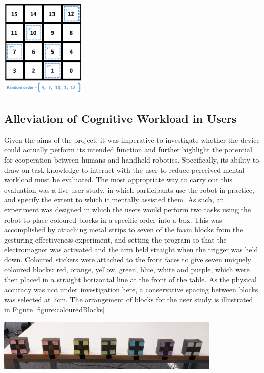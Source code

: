 \documentclass[11pt]{article}
\begin{document}
\begin{center}
\includegraphics[width=0.3\textwidth]{images/gridSequence.png}
\label{figure:gridSequence}
\end{center}



\subsection{Alleviation of Cognitive Workload in Users}

Given the aims of the project, it was imperative to investigate whether the device could actually perform its intended function and further highlight the potential for cooperation between humans and handheld robotics. Specifically, its ability to draw on task knowledge to interact with the user to reduce perceived mental workload must be evaluated. The most appropriate way to carry out this evaluation was a live user study, in which participants use the robot in practice, and specify the extent to which it mentally assisted them. As such, an experiment was designed in which the users would perform two tasks using the robot to place coloured blocks in a specific order into a box. This was accomplished by attaching metal strips to seven of the foam blocks from the gesturing effectiveness experiment, and setting the program so that the electromagnet was activated and the arm held straight when the trigger was held down. Coloured stickers were attached to the front faces to give seven uniquely coloured blocks: red, orange, yellow, green, blue, white and purple, which were then placed in a straight horizontal line at the front of the table. As the physical accuracy was not under investigation here, a conservative spacing between blocks was selected at 7cm. The arrangement of blocks for the user study is illustrated in Figure \ref{figure:colouredBlocks}

\begin{center}
\includegraphics[width=0.8\textwidth]{images/colouredBlocks.png}
\label{figure:colouredBlocks}
\end{center}
\end{document}
